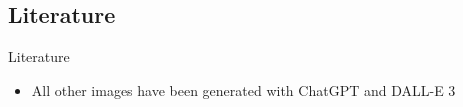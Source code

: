 \documentclass[aspectratio=169, hyperref={colorlinks=true, allcolors=SecondaryColor}, c]{beamer}
\begin{document}
\ifliterature
	\begin{withoutheadline}
	\section{Literature}
	\end{withoutheadline}

	\begin{frame}[allowframebreaks]{Literature}
		\printbibliography
		\begin{itemize}
			\item All other images have been generated with ChatGPT and DALL-E 3
		\end{itemize}
	\end{frame}


\else
\fi
\end{document}
